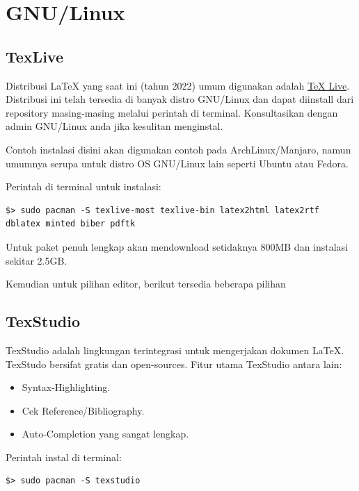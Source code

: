 \documentclass{book} %
\begin{document}
	\section{GNU/Linux}

	\subsection{TexLive}

	Distribusi \LaTeX{} yang saat ini (tahun 2022) umum digunakan adalah \href{https://www.tug.org/texlive/}{TeX Live}.
	Distribusi ini telah tersedia di banyak distro GNU/Linux dan dapat diinstall dari repository masing-masing melalui perintah di terminal.
	Konsultasikan dengan admin GNU/Linux anda jika kesulitan menginstal.

	Contoh instalasi disini akan digunakan contoh pada ArchLinux/Manjaro, namun umumnya serupa untuk distro OS GNU/Linux lain seperti Ubuntu atau Fedora.

	Perintah di terminal untuk instalasi:
	\begin{verbatim}
$> sudo pacman -S texlive-most texlive-bin latex2html latex2rtf dblatex minted biber pdftk
	\end{verbatim}

	Untuk paket penuh lengkap akan mendownload setidaknya 800MB dan instalasi sekitar 2.5GB.

	\bigskip

	Kemudian untuk pilihan editor, berikut tersedia beberapa pilihan

	\subsection{TexStudio}

	TexStudio adalah lingkungan terintegrasi untuk mengerjakan dokumen \LaTeX{}.
	TexStudo bersifat gratis dan open-sources.
	Fitur utama TexStudio antara lain:
	\begin{itemize}
		\item Syntax-Highlighting.
		\item Cek Reference/Bibliography.
		\item Auto-Completion yang sangat lengkap.
	\end{itemize}

	Perintah instal di terminal:

	\begin{verbatim}
$> sudo pacman -S texstudio
	\end{verbatim}
\end{document}
